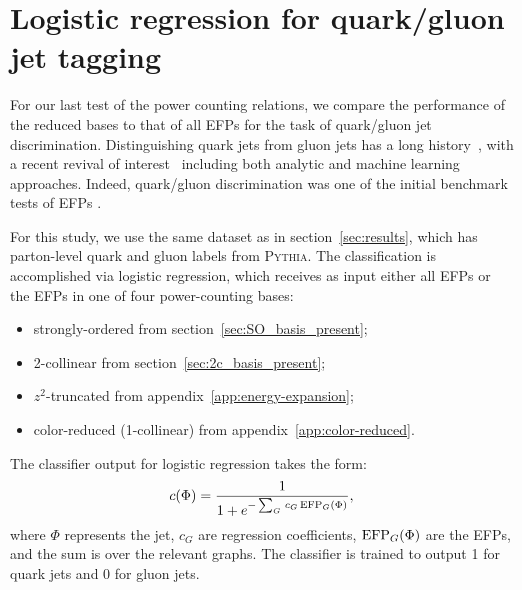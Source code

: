 \documentclass[a4paper,11pt]{article}
\renewcommand{\sec}[1]{section~\ref{sec:#1}}
\newcommand{\app}[1]{appendix~\ref{app:#1}}
\newcommand{\Pythia}{\textsc{Pythia}\xspace}
\begin{document}
\section{Logistic regression for quark/gluon jet tagging}
\label{sec:tagging}




For our last test of the power counting relations, we compare the performance of the reduced bases to that of all EFPs for the task of quark/gluon jet discrimination.
%
Distinguishing quark jets from gluon jets has a long history~\cite{Nilles:1980ys,Jones:1988ay,Fodor:1989ir,Jones:1990rz,Lonnblad:1990qp,Pumplin:1991kc}, with a recent revival of interest~\cite{Gallicchio:2011xq,Gallicchio:2012ez,Bhattacherjee:2015psa,FerreiradeLima:2016gcz,Gras:2017jty} including both analytic \cite{Larkoski:2014pca,Frye:2017yrw,Mo:2017gzp,Larkoski:2019nwj} and machine learning \cite{Komiske:2016rsd,Metodiev:2018ftz,Komiske:2018vkc,Cheng:2017rdo,Luo:2017ncs,Kasieczka:2018lwf} approaches.
%
Indeed, quark/gluon discrimination was one of the initial benchmark tests of EFPs \cite{Komiske:2017aww}. 




For this study, we use the same dataset as in \sec{results}, which has parton-level quark and gluon labels from \Pythia.
%
The classification is accomplished via logistic regression, which receives as input either all EFPs or the EFPs in one of four power-counting bases:
%
\begin{itemize}
    \item strongly-ordered from \sec{SO_basis_present};
    \item 2-collinear from \sec{2c_basis_present};
    \item $z^2$-truncated from \app{energy-expansion}; 
    \item color-reduced (1-collinear) from \app{color-reduced}.
\end{itemize}
%
The classifier output for logistic regression takes the form:
%
\begin{equation}
    c(\Phi) = 
    \frac{1}{1 + e^{- \sum_G \, c_G \, {\rm EFP}_G(\Phi)}},
\end{equation}
%
where $\Phi$ represents the jet, $c_G$ are regression coefficients, ${\rm EFP}_G(\Phi)$ are the EFPs, and the sum is over the relevant graphs.
%
The classifier is trained to output 1 for quark jets and 0 for gluon jets.
\end{document}
